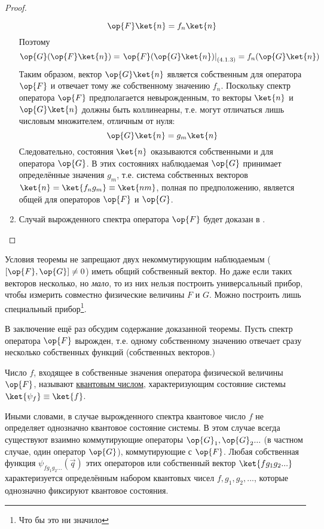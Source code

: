 \begin{proof}
\begin{enumerate}
\begin{equation}
  \label{eq:4_1_3}
  \op{F} \ket{n} = f_n \ket{n}
\end{equation}%
%
Поэтому
$$
  \op{G}(\op{F} \ket{n}) =
    \left. \op{F}(\op{G}\ket{n}) \right|_{(4.1.3)} =
    f_n (\op{G}\ket{n})
$$%
%
Таким образом, вектор $\op{G} \ket{n}$ является собственным для оператора $\op{F}$ и отвечает тому же собственному значению $f_n$. Поскольку спектр оператора $\op{F}$ предполагается невырожденным, то векторы $\ket{n}$ и $\op{G} \ket{n}$ должны быть коллинеарны, т.е. могут отличаться лишь числовым множителем, отличным от нуля:
$$
\op{G} \ket{n} = g_m \ket{n}
$$%
%
Следовательно, состояния $\ket{n}$ оказываются собственными и для оператора $\op{G}$. В этих состояниях наблюдаемая $\op{G}$ принимает определённые значения $g_m$, т.е. система собственных векторов $\ket{n} = \ket{f_n g_m} \equiv \ket{nm}$, полная по предположению, является общей для операторов $\op{F}$ и $\op{G}$.

\item Случай вырожденного спектра оператора $\op{F}$ будет доказан в .
\end{enumerate}
\end{proof}

Условия теоремы не запрещают двух некоммутирующим наблюдаемым ($[\op{F},\op{G}] \ne 0$) иметь общий собственный вектор. Но даже если таких векторов несколько, но {\em мало}, то из них нельзя построить универсальный прибор, чтобы измерить совместно физические величины $F$ и $G$. Можно построить лишь специальный прибор\footnote{Что бы это ни значило}.

В заключение ещё раз обсудим содержание доказанной теоремы. Пусть спектр оператора $\op{F}$ вырожден, т.е. одному собственному значению отвечает сразу несколько собственных функций (собственных векторов.)

\begin{defn}
Число $f$, входящее в собственные значения оператора физической величины $\op{F}$, называют \underline{квантовым числом}, характеризующим состояние системы $\ket{\psi_f} \equiv \ket{f}$.
\end{defn}%
%
Иными словами, в случае вырожденного спектра квантовое число $f$ не определяет однозначно квантовое состояние системы. В этом случае всегда существуют взаимно коммутирующие операторы $\op{G}_1, \op{G}_2...$ (в частном случае, один оператор $\op{G}$), коммутирующие с $\op{F}$. Любая собственная функция $\psi_{f g_1 g_2 ...}(\vec{q})$ этих операторов или собственный вектор $\ket{f g_1 g_2 ...}$ характеризуется определённым набором квантовых чисел $f, g_1, g_2, ...$, которые однозначно фиксируют квантовое состояния.

